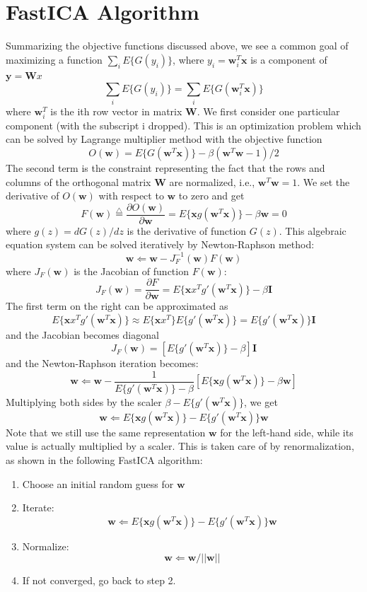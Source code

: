 \documentclass[12pt, a4paper, onecolumn]{IEEEtran}
\begin{document}
\section{FastICA Algorithm}

Summarizing the objective functions discussed above, we see a common goal of
maximizing a function $\sum_i E\{ G(y_i) \}$, where $y_i={\mathbf w}_i^T
{\mathbf x}$ is a component of ${\mathbf y}={\mathbf Wx}$
\[	\sum_i E\{ G(y_i) \}=\sum_i E\{ G( {\mathbf w}_i^T {\mathbf x} ) \}	\]
where ${\mathbf w}_i^T$ is the ith row vector in matrix ${\mathbf W}$. We first
consider one particular component (with the subscript i dropped). This is an
optimization problem which can be solved by Lagrange multiplier method with
the objective function
\[	O({\mathbf w})=E\{ G( {\mathbf w}^T {\mathbf x} ) \}
	-\beta( {\mathbf w}^T{\mathbf w}-1)/2	\]
The second term is the constraint representing the fact that the rows and
columns of the orthogonal matrix ${\mathbf W}$ are normalized, i.e.,
${\mathbf w}^T{\mathbf w}=1$. We set the derivative of $O({\mathbf w})$ with
respect to ${\mathbf w}$ to zero and get
\[	F({\mathbf w})\stackrel{\triangle}{=}
	\frac{\partial O({\mathbf w})}{ \partial {\mathbf w}}
	=E\{ {\mathbf x}g( {\mathbf w}^T {\mathbf x} ) \}-\beta {\mathbf w}=0	\]
where $g(z)=dG(z)/dz$ is the derivative of function $G(z)$. This algebraic
equation system can be solved iteratively by Newton-Raphson method:
\[ {\mathbf w} \Leftarrow {\mathbf w}-J_F^{-1}({\mathbf w}) F({\mathbf w}) \]
where $J_F({\mathbf w})$ is the Jacobian of function $F({\mathbf w})$:
\[
J_F({\mathbf w})=\frac{\partial F}{\partial {\mathbf w}}=
E\{{\mathbf xx}^T g'({\mathbf w}^T{\mathbf x})\}-\beta{\mathbf I}
\]
The first term on the right can be approximated as
\[ E\{{\mathbf xx}^T g'({\mathbf w}^T{\mathbf x})\}
	\approx E\{{\mathbf xx}^T\} E\{g'({\mathbf w}^T{\mathbf x})\}
	=E\{g'({\mathbf w}^T{\mathbf x})\} {\mathbf I}
\]
and the Jacobian becomes diagonal
\[ J_F({\mathbf w})=[E\{g'({\mathbf w}^T{\mathbf x})\}-\beta] {\mathbf I} \]
and the Newton-Raphson iteration becomes:
\[ {\mathbf w} \Leftarrow {\mathbf w}-\frac{1}{E\{g'({\mathbf w}^T{\mathbf x})\}-\beta}[E\{ {\mathbf x}g( {\mathbf w}^T {\mathbf x} ) \}-\beta {\mathbf w}]
	\]
Multiplying both sides by the scaler $\beta-E\{g'({\mathbf w}^T{\mathbf x})\}$,
we get
\[ {\mathbf w} \Leftarrow E\{ {\mathbf x}g( {\mathbf w}^T {\mathbf x} ) \}
-E\{g'({\mathbf w}^T{\mathbf x})\} {\mathbf w}	\]
Note that we still use the same representation ${\mathbf w}$ for the
left-hand side, while its value is actually multiplied by a scaler. This is
taken care of by renormalization, as shown in the following FastICA algorithm:
\begin{enumerate}
\item Choose an initial random guess for ${\mathbf w}$
\item Iterate:
\[ {\mathbf w} \Leftarrow E\{ {\mathbf x}g( {\mathbf w}^T {\mathbf x} ) \}
	-E\{g'({\mathbf w}^T{\mathbf x})\} {\mathbf w}	\]
\item Normalize:
	\[ {\mathbf w} \Leftarrow {\mathbf w}/||{\mathbf w}||	\]
\item If not converged, go back to step 2.
\end{enumerate}
\end{document}
